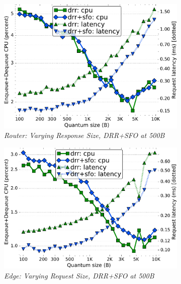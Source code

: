 \begin{figure}[th!]
  \begin{subfigure}[t]{.30\linewidth}
    \centering
    \includegraphics[width=0.95\linewidth]{figs/burst_cn_2t4x16_mn_2tb2x4_css_500_bbr3_kp_lat_drr_basic_fq_drr.pdf}
    \caption{\small{\textit{Router: Varying Response Size, DRR+SFO at 500B}}}
    \label{fig:request-bbr3-drr-full}
  \end{subfigure}
  \begin{subfigure}[t]{.30\linewidth}
    \centering
    \includegraphics[width=0.95\linewidth]{figs/burst_edge_cn_2t1x32_mn_2tb1x8_css_500_bbr3_kp_lat_drr_basic_fq_drr.pdf}
    \caption{\small{\textit{Edge: Varying Request Size, DRR+SFO at 500B}}}
    \label{fig:request-edge-bbr3-drr-full}
  \end{subfigure}
  \begin{subfigure}[t]{.30\linewidth}
    \centering

\end{subfigure}
\end{figure}
